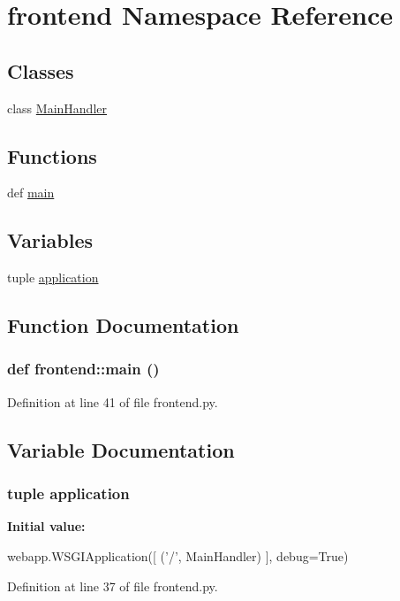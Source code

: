 \hypertarget{namespacefrontend}{
\section{frontend Namespace Reference}
\label{namespacefrontend}
}
\subsection*{Classes}
\begin{DoxyCompactItemize}
\item 
class \hyperlink{classfrontend_1_1_main_handler}{MainHandler}
\end{DoxyCompactItemize}
\subsection*{Functions}
\begin{DoxyCompactItemize}
\item 
def \hyperlink{namespacefrontend_a33dc4d3f6979de00900cffcff200db2d}{main}
\end{DoxyCompactItemize}
\subsection*{Variables}
\begin{DoxyCompactItemize}
\item 
tuple \hyperlink{namespacefrontend_a84bbed69751228281d405bfe08a3cc1d}{application}
\end{DoxyCompactItemize}


\subsection{Function Documentation}
\hypertarget{namespacefrontend_a33dc4d3f6979de00900cffcff200db2d}{
\subsubsection[{main}]{\setlength{\rightskip}{0pt plus 5cm}def frontend::main ()}}
\label{namespacefrontend_a33dc4d3f6979de00900cffcff200db2d}


Definition at line 41 of file frontend.py.

\subsection{Variable Documentation}
\hypertarget{namespacefrontend_a84bbed69751228281d405bfe08a3cc1d}{
\subsubsection[{application}]{\setlength{\rightskip}{0pt plus 5cm}tuple {\bf application}}}
\label{namespacefrontend_a84bbed69751228281d405bfe08a3cc1d}
{\bfseries Initial value:}
\begin{DoxyCode}
webapp.WSGIApplication([
    ('/', MainHandler)
], debug=True)
\end{DoxyCode}


Definition at line 37 of file frontend.py.